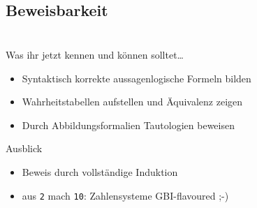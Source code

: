 \subsection{Beweisbarkeit}



\section{}
	\begin{frame}{Was ihr jetzt kennen und können solltet\dots}
			\begin{itemize}
				\item Syntaktisch korrekte aussagenlogische Formeln bilden
				\item Wahrheitstabellen aufstellen und Äquivalenz zeigen
				\item Durch Abbildungsformalien Tautologien beweisen
			\end{itemize}
	
	\end{frame}
\begin{frame}[fragile]{Ausblick}
 		\begin{itemize}
 			\item Beweis durch vollständige Induktion
 			\item aus \verb+2+ mach \verb+10+: Zahlensysteme GBI-flavoured ;-)
 		\end{itemize}
\end{frame}
\section{}
\questionframe
\lastframe
{}
